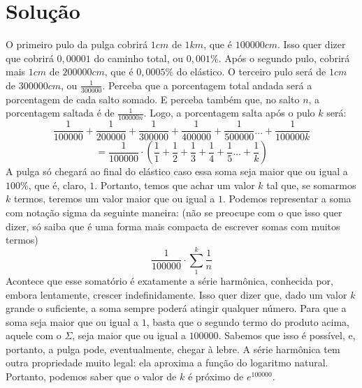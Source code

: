 \documentclass{article}
\begin{document}
\section{Solução}

O primeiro pulo da pulga cobrirá \(1cm\) de \(1km\), que é \(100000cm\). Isso quer dizer que cobrirá \(0,00001\) do caminho total, ou \(0,001\%\).
Após o segundo pulo, cobrirá mais \(1cm\) de \(200000cm\), que é \(0,0005\%\) do elástico. O terceiro pulo será de \(1cm\) de \(300000cm\), ou \(\frac{1}{300000}\). Perceba que a porcentagem total andada será a porcentagem de cada salto somado. E perceba também que, no salto \(n\), a porcentagem saltada é de \(\frac{1}{100000n}\). Logo, a porcentagem salta após o pulo \(k\) será:
\[\frac{1}{100000}+\frac{1}{200000}+\frac{1}{300000}+\frac{1}{400000}+\frac{1}{500000}\dots+\frac{1}{100000k}\]
\[=\frac{1}{100000}\cdot (\frac{1}{1}+\frac{1}{2}+\frac{1}{3}+\frac{1}{4}+\frac{1}{5}\dots+\frac{1}{k})\]
A pulga só chegará ao final do elástico caso essa soma seja maior que ou igual a \(100\%\), que é, claro, \(1\). Portanto, temos que achar um valor \(k\) tal que, se somarmos \(k\) termos, teremos um valor maior que ou igual a \(1\).
Podemos representar a soma com notação sigma da seguinte maneira: (não se preocupe com o que isso quer dizer, só saiba que é uma forma mais compacta de escrever somas com muitos termos)
\[\frac{1}{100000}\cdot\sum_{1}^{k}\frac{1}{n}\]
Acontece que esse somatório é exatamente a série harmônica, conhecida por, embora lentamente, crescer indefinidamente. Isso quer dizer que, dado um valor \(k\) grande o suficiente, a soma sempre poderá atingir qualquer número. Para que a soma seja maior que ou igual a \(1\), basta que o segundo termo do produto acima, aquele com o \(\Sigma\), seja maior que ou igual a \(100000\). Sabemos que isso é possível, e, portanto, a pulga pode, eventualmente, chegar à lebre.
A série harmônica tem outra propriedade muito legal: ela aproxima a função do logaritmo natural. Portanto, podemos saber que o valor de \(k\) é próximo de \(e^{100000}\).
\end{document}
